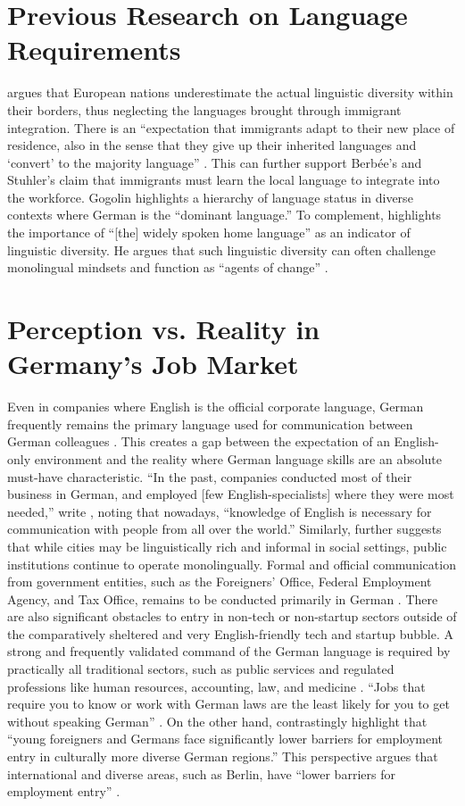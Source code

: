 \section{Previous Research on Language Requirements}
\citet{gogolin02} argues that European nations underestimate the actual linguistic diversity within their borders, thus neglecting the languages brought through immigrant integration. There is an “expectation that immigrants adapt to their new place of residence, also in the sense that they give up their inherited languages and ‘convert’ to the majority language” \citep{gogolin02}. This can further support Berbée’s and Stuhler’s claim that immigrants must learn the local language to integrate into the workforce. Gogolin highlights a hierarchy of language status in diverse contexts where German is the “dominant language.” To complement, \citet{Extra10diversity} highlights the importance of “[the] widely spoken home language” as an indicator of linguistic diversity. He argues that such linguistic diversity can often challenge monolingual mindsets and function as “agents of change” \citep{Extra10diversity}.


\section{Perception vs. Reality in Germany's Job Market}
Even in companies where English is the official corporate language, German frequently remains the primary language used for communication between German colleagues \citep{ErlingWalton07}. This creates a gap between the expectation of an English-only environment and the reality where German language skills are an absolute must-have characteristic. “In the past, companies conducted most of their business in German, and employed [few English-specialists] where they were most needed,” write \citet{ErlingWalton07}, noting that nowadays, “knowledge of English is necessary for communication with people from all over the world.”
Similarly, \citet{Extra10diversity} further suggests that while cities may be linguistically rich and informal in social settings, public institutions continue to operate monolingually.  Formal and official communication from government entities, such as the Foreigners’ Office, Federal Employment Agency, and Tax Office, remains to be conducted primarily in German \citep{kummuni25Language}. There are also significant obstacles to entry in non-tech or non-startup sectors outside of the comparatively sheltered and very English-friendly tech and startup bubble. A strong and frequently validated command of the German language is required by practically all traditional sectors, such as public services and regulated professions like human resources, accounting, law, and medicine \citep{simplegermany25}. “Jobs that require you to know or work with German laws are the least likely for you to get without speaking German” \citep{simplegermany25}. On the other hand, \citet{DamelangHaas12} contrastingly highlight that “young foreigners and Germans face significantly lower barriers for employment entry in culturally more diverse German regions.” This perspective argues that international and diverse areas, such as Berlin, have “lower barriers for employment entry” \citep{DamelangHaas12}.
